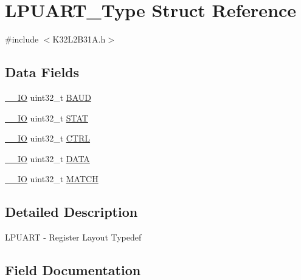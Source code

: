 \hypertarget{struct_l_p_u_a_r_t___type}{}\section{L\+P\+U\+A\+R\+T\+\_\+\+Type Struct Reference}
\label{struct_l_p_u_a_r_t___type}


{\ttfamily \#include $<$K32\+L2\+B31\+A.\+h$>$}

\subsection*{Data Fields}
\begin{DoxyCompactItemize}
\item 
\mbox{\hyperlink{core__cm0plus_8h_aec43007d9998a0a0e01faede4133d6be}{\+\_\+\+\_\+\+IO}} uint32\+\_\+t \mbox{\hyperlink{struct_l_p_u_a_r_t___type_a715a225c91b8c19aa933f75d516e4edd}{B\+A\+UD}}
\item 
\mbox{\hyperlink{core__cm0plus_8h_aec43007d9998a0a0e01faede4133d6be}{\+\_\+\+\_\+\+IO}} uint32\+\_\+t \mbox{\hyperlink{struct_l_p_u_a_r_t___type_aa90c98b3b95ed1374dbcf018c74aef79}{S\+T\+AT}}
\item 
\mbox{\hyperlink{core__cm0plus_8h_aec43007d9998a0a0e01faede4133d6be}{\+\_\+\+\_\+\+IO}} uint32\+\_\+t \mbox{\hyperlink{struct_l_p_u_a_r_t___type_a15fc8d35f045f329b80c544bef35ff64}{C\+T\+RL}}
\item 
\mbox{\hyperlink{core__cm0plus_8h_aec43007d9998a0a0e01faede4133d6be}{\+\_\+\+\_\+\+IO}} uint32\+\_\+t \mbox{\hyperlink{struct_l_p_u_a_r_t___type_a54cb6b41986c241ca85af803e9cd6101}{D\+A\+TA}}
\item 
\mbox{\hyperlink{core__cm0plus_8h_aec43007d9998a0a0e01faede4133d6be}{\+\_\+\+\_\+\+IO}} uint32\+\_\+t \mbox{\hyperlink{struct_l_p_u_a_r_t___type_a04dafd3ac005ff337f83b0a17755161f}{M\+A\+T\+CH}}
\end{DoxyCompactItemize}


\subsection{Detailed Description}
L\+P\+U\+A\+RT -\/ Register Layout Typedef 

\subsection{Field Documentation}
\mbox{\label{struct_l_p_u_a_r_t___type_a715a225c91b8c19aa933f75d516e4edd}} 

